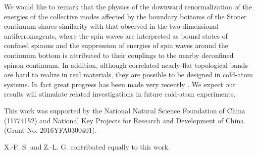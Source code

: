 \documentclass[amsmath,superscriptaddress,showpacs,aps,prb,twocolumn]{revtex4-1}
\begin{document}
\par We would like to remark that the physics of the downward renormalization of the energies of the collective modes affected by the boundary bottoms of the Stoner continuum shares similarity with that observed in the two-dimensional antiferromagents, where the spin waves are interpreted as bound states of confined spinons and the suppression of energies of spin waves around the continuum bottom is attributed to their couplings to the nearby deconfined spinon continuum\cite{ZFSMC_PRL2006,TS_PRL2013,DMCNTPEMIR_NP2015,SQCCMS_PRX2017,YWDYL_PRB2018}. In addition, although correlated nearly-flat topological bands are hard to realize in real materials, they are possible to be designed in cold-atom systems. In fact great progress has been made very recently \cite{LCJPS_N2009,AALBPB_PRL2013,MSKBK_PRL2013,JMDLUGE_N2014}. We expect our results will stimulate related investigations in future cold-atom experiments.

\begin{acknowledgments}
\par This work was supported by the National Natural Science Foundation of China (11774152) and National Key Projects for Research and Development of China (Grant No. 2016YFA0300401).
\par X.-F. S. and Z.-L. G. contributed equally to this work.
\end{acknowledgments}


\end{document}

